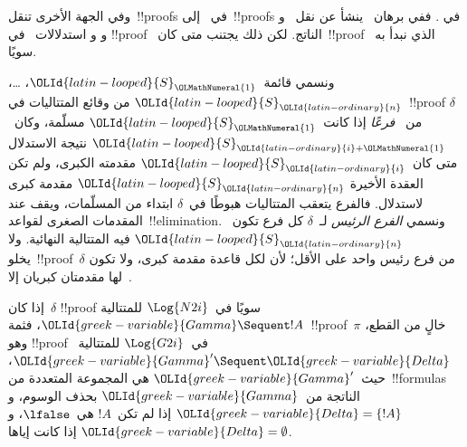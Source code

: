 \documentclass[../../../include/open-logic-section]{subfiles}
\begin{document}
وفي الجهة الأخرى تنقل~!!{proof}s في~ إلى~!!{proof}s في
. ففي برهان~ ينشأ عن نقل~\Elim{\land} و
\Elim{\lif} و\Elim{\lnot} و\Elim{\lforall} استدلالات~\Cut{} في
!!{proof}~ الناتج. لكن ذلك يجتنب متى كان~!!{proof}~
الذي نبدأ به سويًا.

ونسمي قائمة~$\OLId{latin-looped}{S}_\OLMathNumeral{1}$، \dots، $\OLId{latin-looped}{S}_\OLId{latin-ordinary}{n}$ من وقائع المتتاليات في~!!{proof}
$\delta$ من~ \emph{فرعًا} إذا كانت~$\OLId{latin-looped}{S}_\OLMathNumeral{1}$ مسلّمة، وكان~$\OLId{latin-looped}{S}_{\OLId{latin-ordinary}{i}+\OLMathNumeral{1}}$
نتيجة الاستدلال متى كان~$\OLId{latin-looped}{S}_\OLId{latin-ordinary}{i}$ مقدمته الكبرى، ولم تكن العقدة الأخيرة
$\OLId{latin-looped}{S}_\OLId{latin-ordinary}{n}$ مقدمة كبرى لاستدلال. فالفرع يتعقب المتتاليات هبوطًا في~$\delta$
ابتداء من المسلّمات، ويقف عند المقدمات الصغرى لقواعد~!!{elimination}.
ونسمي \emph{الفرع الرئيس} لـ~$\delta$ كل فرع تكون~$\OLId{latin-looped}{S}_\OLId{latin-ordinary}{n}$ فيه المتتالية
النهائية. ولا يخلو~!!{proof}~$\delta$ من فرع رئيس واحد على الأقل؛ لأن
لكل قاعدة مقدمة كبرى، ولا تكون لها مقدمتان كبريان إلا~\Intro{\land}.

\begin{prop}
إذا كان~$\delta$ !!{proof} سويًا في~$\Log{N2i}$ للمتتالية
$\OLId{greek-variable}{Gamma} \Sequent !A$، فثمة~!!{proof}~$\pi$ خالٍ من القطع، وهو
!!{proof} في~$\Log{G2i}$
للمتتالية~$\OLId{greek-variable}{Gamma}' \Sequent \OLId{greek-variable}{Delta}$، حيث~$\OLId{greek-variable}{Gamma}'$ هي المجموعة المتعددة
من~!!{formula}s الناتجة من~$\OLId{greek-variable}{Gamma}$ بحذف الوسوم، و
$\OLId{greek-variable}{Delta}=\{!A\}$ إذا لم تكن~$!A$ هي~$\lfalse$، و
$\OLId{greek-variable}{Delta}=\emptyset$ إذا كانت إياها.
\end{prop}
\end{document}
